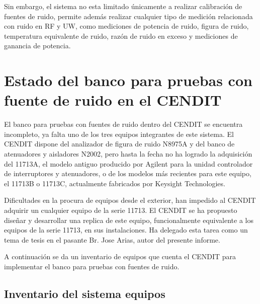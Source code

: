 \documentclass{article}
\begin{document}
	Sin embargo, el sistema no esta limitado únicamente a realizar calibración de fuentes de ruido, permite además realizar	cualquier tipo de medición relacionada con ruido en RF y UW, como mediciones de potencia de ruido, figura de ruido, temperatura equivalente de ruido, razón de ruido en exceso y mediciones de ganancia de potencia.
	
	\section{Estado del banco para pruebas con fuente de ruido en el CENDIT}
	El banco para pruebas con fuentes de ruido dentro del CENDIT se encuentra incompleto, ya falta uno de los tres equipos integrantes de este sistema. El CENDIT dispone del analizador de figura de ruido N8975A y del banco de atenuadores y aisladores N2002, pero hasta la fecha no ha logrado la adquisición del 11713A, el modelo antiguo producido por Agilent para la unidad controlador de interruptores y atenuadores, o de los modelos más recientes para este equipo, el 11713B o 11713C, actualmente fabricados por Keysight Technologies.
	
	Dificultades en la procura de equipos desde el exterior, han impedido al CENDIT adquirir un cualquier equipo de la serie 11713. El CENDIT se ha propuesto diseñar y desarrollar una replica de este equipo, funcionalmente equivalente a los equipos de la serie 11713, en sus instalaciones. Ha delegado esta tarea como un tema de tesis en el pasante Br. Jose Arias, autor del presente informe.
	
	A continuación se da un inventario de equipos que cuenta el CENDIT para implementar el banco para pruebas con fuentes de ruido.
	
	\subsection{Inventario del sistema equipos}
	
\end{document}
